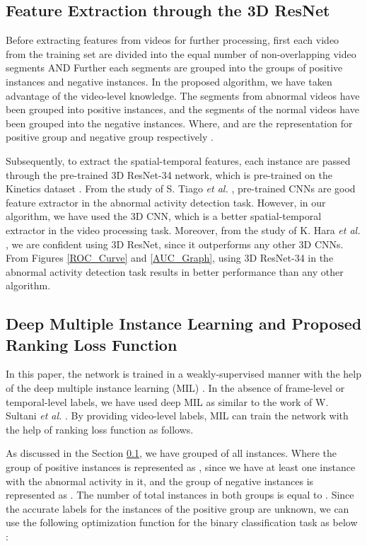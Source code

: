 \documentclass[conference]{IEEEtran}
\begin{document}
\subsection{Feature Extraction through the 3D ResNet} \label{ResNet}
Before extracting features from videos for further processing, first each video from the training set are divided into the equal number of non-overlapping video segments AND Further each segments are grouped into the groups of positive instances and negative instances. In the proposed algorithm, we have taken advantage of the video-level knowledge. The segments from abnormal videos have been grouped into positive instances, and the segments of the normal videos have been grouped into the negative instances. Where,  and  are the representation for positive group and negative group respectively \cite{A6}.

Subsequently, to extract the spatial-temporal features, each instance are passed through the pre-trained 3D ResNet-34 \cite{A5,A13} network, which is pre-trained on the Kinetics dataset \cite{A23}. From the study of S. Tiago \textit{et al.} \cite{A21}, pre-trained CNNs are good feature extractor in the abnormal activity detection task. However, in our algorithm, we have used the 3D CNN, which is a better spatial-temporal extractor in the video processing task. Moreover, from the study of K. Hara \textit{et al.} \cite{A5,A13}, we are confident using 3D ResNet, since it outperforms any other 3D CNNs.
From Figures \ref{ROC_Curve} and \ref{AUC_Graph}, using 3D ResNet-34 in the abnormal activity detection task results in better performance than any other algorithm.

\subsection{Deep Multiple Instance Learning and Proposed Ranking Loss Function}
In this paper, the network is trained in a weakly-supervised manner with the help of the deep multiple instance learning (MIL) \cite{A12,A24}. In the absence of frame-level or temporal-level labels, we have used deep MIL as similar to the work of W. Sultani \textit{et al.} \cite{A6}. By providing video-level labels, MIL can train the network with the help of ranking loss function as  follows.

As discussed in the Section \ref{ResNet}, we have grouped of all instances. Where the group of positive instances is represented as , since we have at least one instance with the abnormal activity in it, and the group of negative instances is represented as . The number of total instances in both groups is equal to . Since the accurate labels for the instances of the positive group are unknown, we can use the following optimization function \cite{A24} for the binary classification task as below \cite{A24}:
\end{document}

